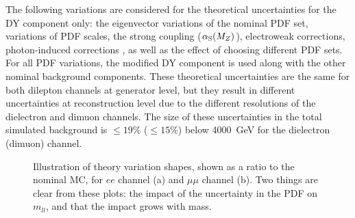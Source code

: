 The following variations are considered for the theoretical uncertainties for the DY component only: the eigenvector variations of the nominal PDF set, variations of PDF scales, the strong coupling ($\alpha_{\textrm S}(M_Z)$), electroweak corrections, photon-induced corrections \cite{Martin:2005pi}, as well as the effect of choosing different PDF sets.
For all PDF variations, the modified DY component is used along with the other nominal background components.
These theoretical uncertainties are the same for both dilepton channels at generator level, but they result in different uncertainties at reconstruction level due to the different resolutions of the dielectron and dimuon channels.
The size of these uncertainties in the total simulated background is $\leq 19\%$ ($\leq 15\%$) below 4000~GeV for the dielectron (dimuon) channel.

\begin{figure}[htp]
\centering
{}
\caption{Illustration of theory variation shapes, shown as a ratio to the nominal MC, for $ee$ channel (a) and $\mu\mu$ channel (b). Two things are clear from these plots: the impact of the uncertainty in the PDF on $m_{ll}$, and that the impact grows with mass.}
\label{fig:ciThyVar}
\end{figure}

